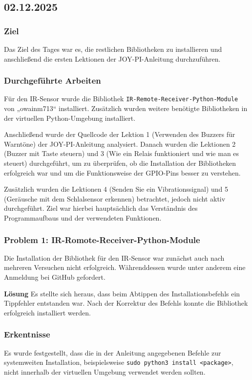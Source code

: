 \subsection{02.12.2025}

\subsubsection{Ziel}
Das Ziel des Tages war es, die restlichen Bibliotheken zu installieren
und anschließend die ersten Lektionen der JOY-PI-Anleitung durchzuführen.

\subsubsection{Durchgeführte Arbeiten}
Für den IR-Sensor wurde die Bibliothek
\texttt{IR-Remote-Receiver-Python-Module} von „owainm713“
installiert. Zusätzlich wurden weitere benötigte Bibliotheken in der
virtuellen Python-Umgebung installiert.

Anschließend wurde der Quellcode der Lektion 1 (Verwenden des Buzzers für Warntöne) der
JOY-PI-Anleitung analysiert. Danach wurden die Lektionen 2 (Buzzer mit Taste steuern) 
und 3 (Wie ein Relais funktioniert und wie man es steuert)
durchgeführt, um zu überprüfen, ob die Installation der Bibliotheken
erfolgreich war und um die Funktionsweise der GPIO-Pins besser zu
verstehen.

Zusätzlich wurden die Lektionen 4 (Senden Sie ein Vibrationssignal) und 5 
(Geräusche mit dem Schlalsensor erkennen) betrachtet, jedoch nicht aktiv
durchgeführt. Ziel war hierbei hauptsächlich das Verständnis des
Programmaufbaus und der verwendeten Funktionen.


\subsubsection{Problem 1: IR-Romote-Receiver-Python-Module}
Die Installation der Bibliothek für den IR-Sensor war zunächst auch nach
mehreren Versuchen nicht erfolgreich. Währenddessen wurde unter anderem
eine Anmeldung bei GitHub gefordert.

\textbf{Lösung}
Es stellte sich heraus, dass beim Abtippen des Installationsbefehls ein
Tippfehler entstanden war. Nach der Korrektur des Befehls konnte die
Bibliothek erfolgreich installiert werden.

\subsubsection{Erkentnisse}
Es wurde festgestellt, dass die in der Anleitung angegebenen Befehle zur
systemweiten Installation, beispielsweise
\texttt{sudo python3 install <package>}, nicht innerhalb der virtuellen
Umgebung verwendet werden sollten.

